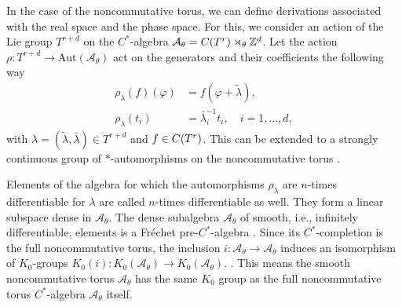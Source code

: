 \documentclass[submission, Phys]{SciPost}
\begin{document}
In the case of the noncommutative torus, we can define derivations associated with the real space and the phase space.
For this, we consider an action of the Lie group $T^{r+d}$ on the $C^\ast$-algebra $\mathcal{A}_\theta=C(T^r)\rtimes_\theta \mathbb{Z}^d$. Let the action $\rho: T^{r+d} \to \textrm{Aut}(\mathcal{A}_\theta)$ act on the generators and their coefficients the following way
\begin{align}
    \rho_\lambda(f)(\varphi) &= f(\varphi+ \tilde{\lambda}),\\
    \rho_\lambda(t_i) &= \bar{\lambda}_i^{-1} t_i,\quad i=1,...,d,
\end{align}
with $\lambda=(\tilde{\lambda},\bar{\lambda})\in T^{r+d}$ and $f\in C(T^r)$.
This can be extended to a strongly continuous group of $\ast$-automorphisms on the noncommutative torus \cite[Prop.~3.10.]{Prodan2017}.

Elements of the algebra for which the automorphisms $\rho_\lambda$ are $n$-times differentiable for $\lambda$ are called $n$-times differentiable as well.
They form a linear subspace dense in $\mathcal{A}_\theta$.
The dense subalgebra $\mathscr{A}_\theta$ of smooth, i.e., infinitely differentiable, elements is a Fr\'echet pre-$C^\ast$-algebra \cite[Prop.~3.45]{Gracia2000}.
Since its $C^*$-completion is the full noncommutative torus, the inclusion $i:\mathscr{A}_\theta\to\mathcal{A}_\theta$ induces an isomorphism of $K_0$-groups $K_0(i): K_0(\mathscr{A}_\theta)\to K_0(\mathcal{A}_\theta)$. \cite[Thm.~3.44]{Gracia2000}. 
This means the smooth noncommutative torus $\mathscr{A}_\theta$ has the same $K_0$ group as the full noncommutative torus $C^\ast$-algebra $\mathcal{A}_\theta$ itself.
\end{document}
